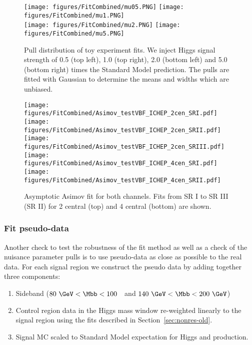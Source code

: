 \begin{figure}[htbp]
  \centering
 \texttt{[image: figures/FitCombined/mu05.PNG]}
 \texttt{[image: figures/FitCombined/mu1.PNG]}\\
 \texttt{[image: figures/FitCombined/mu2.PNG]}
 \texttt{[image: figures/FitCombined/mu5.PNG]}\\
\caption{Pull distribution of toy experiment fits. We inject Higgs signal strength of 0.5 (top left), 1.0 (top right), 2.0 (bottom left) and 5.0 (bottom right) times the Standard Model prediction. The pulls are fitted with Gaussian to determine the means and widths which are unbiased. }
  \label{fig:MCToy-old}
\end{figure}


\begin{figure}[htbp]
  \centering
 \texttt{[image: figures/FitCombined/Asimov\_testVBF\_ICHEP\_2cen\_SRI.pdf]}
 \texttt{[image: figures/FitCombined/Asimov\_testVBF\_ICHEP\_2cen\_SRII.pdf]}
 \texttt{[image: figures/FitCombined/Asimov\_testVBF\_ICHEP\_2cen\_SRIII.pdf]}\\
 \texttt{[image: figures/FitCombined/Asimov\_testVBF\_ICHEP\_4cen\_SRI.pdf]}
 \texttt{[image: figures/FitCombined/Asimov\_testVBF\_ICHEP\_4cen\_SRII.pdf]}\\

\caption{Asymptotic Asimov fit for both channels. Fits from SR I to SR III (SR II) for 2 central (top) and 4 central (bottom) are shown.}
  \label{fig:Asimov-old}
\end{figure}


\subsubsection{Fit pseudo-data}

Another check to test the robustness of the fit method as well as a check of the nuisance parameter pulls 
is to use pseudo-data as close as possible to the real data. 
For each signal region we construct the pseudo data by adding together three components:
\begin{enumerate}
\item Sideband ($80~\GeV <\Mbb<100$~\GeV~and $140~\GeV<\Mbb<200~\GeV$)
\item Control region data in the Higgs mass window re-weighted linearly to the signal region using the fits described in Section~\ref{sec:nonres-old}.
\item Signal MC scaled to Standard Model expectation for Higgs and \zjets{} production.
\end{enumerate}

